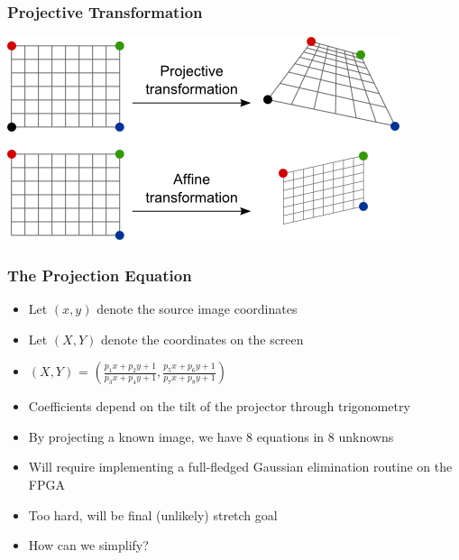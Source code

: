 \documentclass{beamer}
\begin{document}
\begin{frame}
\frametitle{Projective Transformation}
\includegraphics[height=0.5\textheight]{./img/projective_transform}
\end{frame}

\begin{frame}
\frametitle{The Projection Equation}
\begin{itemize}
\item Let $(x, y)$ denote the source image coordinates
\item Let $(X, Y)$ denote the coordinates on the screen
\item $(X, Y)$ = $\left( \frac{p_1x + p_2y + 1}{p_3x + p_4y + 1}, \frac{p_5x + p_6y + 1}{p_7x + p_8y + 1} \right)$
\item Coefficients depend on the tilt of the projector through trigonometry
\pause
\item By projecting a known image, we have 8 equations in 8 unknowns
\item Will require implementing a full-fledged Gaussian elimination routine on the FPGA
\item Too hard, will be final (unlikely) stretch goal
\item How can we simplify?
\end{itemize}
\end{frame}
\end{document}
